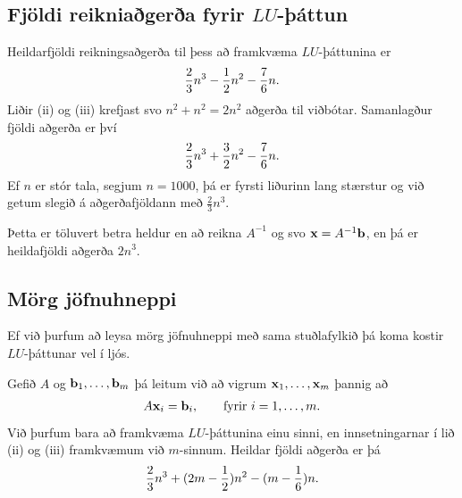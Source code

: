 \documentclass[letterpaper,10pt,icelandic]{sphinxmanual}
\begin{document}
\subsection{Fjöldi reikniaðgerða fyrir \(LU\)-þáttun}
\label{kafli08:fjoldi-reikniagera-fyrir-attun}
Heildarfjöldi reikningsaðgerða til þess að framkvæma
\(LU\)-þáttunina er
\begin{gather}
\begin{split}\frac 23n^3-\frac 12n^2-\frac 76 n.\end{split}\notag
\end{gather}
Liðir (ii) og (iii) krefjast svo \(n^2 + n^2 = 2n^2\) aðgerða til
viðbótar. Samanlagður fjöldi aðgerða er því
\begin{gather}
\begin{split}\frac 23n^3+\frac 32n^2-\frac 76 n.\end{split}\notag
\end{gather}
Ef \(n\) er stór tala, segjum \(n=1000\), þá er fyrsti liðurinn
lang stærstur og við getum slegið á aðgerðafjöldann með
\(\tfrac 23n^3\).

Þetta er töluvert betra heldur en að reikna \(A^{-1}\) og svo
\(\mbox{${\bf x}$}=A^{-1}\mbox{${\bf b}$}\), en þá er heildafjöldi
aðgerða \(2n^3\).


\subsection{Mörg jöfnuhneppi}
\label{kafli08:morg-jofnuhneppi}
Ef við þurfum að leysa mörg jöfnuhneppi með sama stuðlafylkið þá koma
kostir \(LU\)-þáttunar vel í ljós.

Gefið \(A\) og \(\mbox{${\bf b}$}_1,\ldots,\mbox{${\bf b}$}_m\)
þá leitum við að vigrum
\(\mbox{${\bf x}$}_1,\ldots,\mbox{${\bf x}$}_m\) þannig að
\begin{gather}
\begin{split}A\mbox{${\bf x}$}_i = \mbox{${\bf b}$}_i, \qquad \text{fyrir } i = 1,\ldots,m.\end{split}\notag
\end{gather}
Við þurfum bara að framkvæma \(LU\)-þáttunina einu sinni, en
innsetningarnar í lið (ii) og (iii) framkvæmum við \(m\)-sinnum.
Heildar fjöldi aðgerða er þá
\begin{gather}
\begin{split}\frac 23n^3+(2m-\frac 12)n^2- (m-\frac 16) n.\end{split}\notag
\end{gather}
\end{document}
